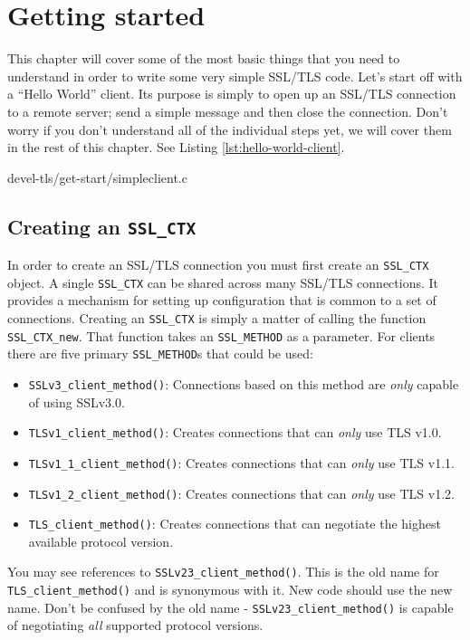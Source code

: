 \chapter{Getting started}
This chapter will cover some of the most basic things that you need to 
understand in order to write some very simple SSL/TLS code. Let's start off with
a ``Hello World'' client. Its purpose is simply to open up an SSL/TLS
connection to a remote server; send a simple message and then close the
connection. Don't worry if you don't understand all of the individual steps yet,
we will cover them in the rest of this chapter. See Listing
\ref{lst:hello-world-client}.


{devel-tls/get-start/simpleclient.c}

\section{Creating an \texttt{SSL\_CTX}}

In order to create an SSL/TLS connection you must first create an
\verb!SSL_CTX! object. A single \verb!SSL_CTX! can be shared across
many SSL/TLS connections. It provides a mechanism for setting up configuration
that is common to a set of connections. Creating an \verb!SSL_CTX! is 
simply a matter of calling the function \verb!SSL_CTX_new!. That function 
takes an \verb!SSL_METHOD! as a parameter. For clients there are five 
primary \verb!SSL_METHOD!s that could be used:
\begin{itemize}
\item \verb!SSLv3_client_method()!: Connections based on this method are 
\emph{only} capable of using SSLv3.0.
\item \verb!TLSv1_client_method()!: Creates connections that can 
\emph{only} use TLS v1.0.
\item \verb!TLSv1_1_client_method()!: Creates connections that can 
\emph{only} use TLS v1.1.
\item \verb!TLSv1_2_client_method()!: Creates connections that can 
\emph{only} use TLS v1.2.
\item \verb!TLS_client_method()!: Creates connections that can negotiate 
the highest available protocol version.
\end{itemize}

You may see references to \verb!SSLv23_client_method()!. This is the old 
name for \verb!TLS_client_method()! and is synonymous with it. New code 
should use the new name. Don't be confused by the old name - 
\verb!SSLv23_client_method()! is capable of negotiating \emph{all} 
supported protocol versions.

